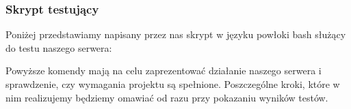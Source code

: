 \subsubsection{Skrypt testujący}

Poniżej przedstawiamy napisany przez nas skrypt w języku powłoki bash służący do testu naszego serwera:

\vspace{0.5cm}

\vspace{0.5cm}

Powyższe komendy mają na celu zaprezentować działanie naszego serwera i sprawdzenie, czy wymagania projektu są spełnione. Poszczególne kroki, które w nim realizujemy będziemy omawiać od razu przy pokazaniu wyników testów.